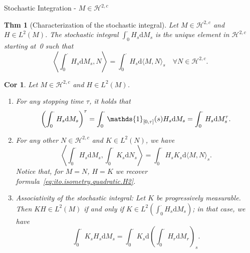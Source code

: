 \documentclass[a4paper]{article}
\theoremstyle{mytheoremstyle}
\newtheorem{theorem}{Thm}
\newtheorem{corollary}{Cor}[theorem]
\newcommand{\1}{\mathds{1}}
\begin{document}
\begin{multicols*}{3}
\begin{roundbox}{Stochastic Integration - $M \in \mathcal{H}^{2, c}$}
\begin{theorem}[Characterization of the stochastic integral]
  \label{thm:ito-H2-char}Let $M \in \mathcal{H}^{2, c}$ and $H \in L^2 (M)$.
  The stochastic integral $\int_0^{\cdot} H_s \mathrm{d} M_s$ is the unique
  element in $\mathcal{H}^{2, c}$ starting at~0 such that
  {
  \small
  \begin{equation}
    \left\langle \int_0^{\cdot} H_s \mathrm{d} M_s, N \right\rangle =
    \int_0^{\cdot} H_s \mathrm{d} \langle M, N \rangle_s \quad \forall N
    \in \mathcal{H}^{2, c} . \label{eq:SIchar}
  \end{equation}
  }
\end{theorem}

\begin{corollary}
  \label{cor:ito-properties-H2}Let $M \in \mathcal{H}^{2, c}$ and $H \in L^2
  (M)$.
  \begin{enumerate}
    \item For any stopping time $\tau$, it holds that
    \vspace{-0.5em}
    \[ 
      \left( \int_0^{\cdot} H_s \mathrm{d} M_s \right)^{\tau} =
       \int_0^{\cdot} \1_{[0, \tau]} (s) H_s \mathrm{d} M_s =
       \int_0^{\cdot} H_s \mathrm{d} M_s^{\tau} .
    \vspace{-0.5em}
    \]
    \item For any other $N \in \mathcal{H}^{2, c}$ and $K \in L^2 (N)$, we
    have
    {
      \small
    \begin{equation}
      \left\langle \int_0^{\cdot} H_s \mathrm{d} M_s, \int_0^{\cdot} K_s
      \mathrm{d} N_s \right\rangle = \int_0^{\cdot} H_s K_s \mathrm{d} \langle M, N
      \rangle_s . \label{eq:cor.ito.properties.ii}
    \end{equation}
    }
    Notice that, for $M = N$, $H = K$ we recover
    formula~\eqref{eq:ito.isometry.quadratic.H2}.
    
    \item {\emph{Associativity of the stochastic integral}}: Let $K$ be
    progressively measurable. Then $K H \in L^2 (M)$ if and only if $K \in L^2
    \left( \int_0^{\cdot} H_s \mathrm{d} M_s \right)$; in that case, we have
    \vspace{-0.5em}
    \[
      \int_0^{\cdot} K_s H_s \mathrm{d} M_s = \int_0^{\cdot} K_s \mathrm{d}
       \left( \int_0^{\cdot} H_r \mathrm{d} M_r \right)_s .
    \]
  \end{enumerate}
\end{corollary}
\end{roundbox}


\end{multicols*}
\end{document}
